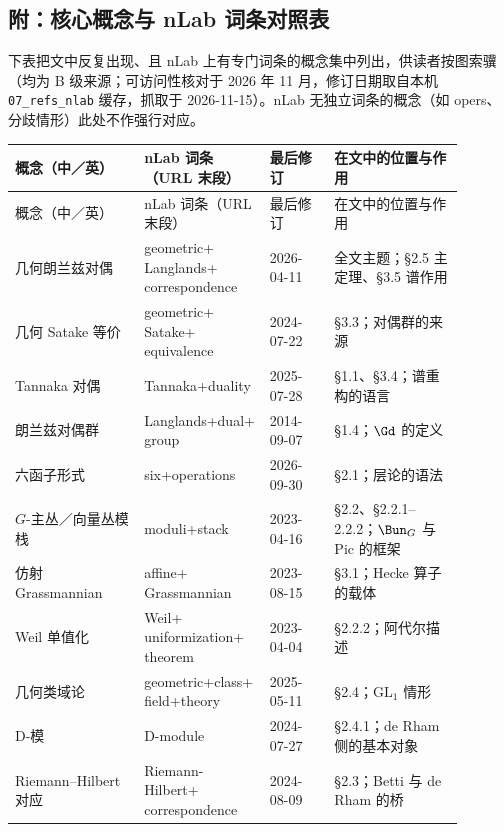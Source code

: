 \subsection*{附：核心概念与 nLab 词条对照表}

下表把文中反复出现、且 nLab 上有专门词条的概念集中列出，供读者按图索骥（均为 B 级来源；可访问性核对于 2026 年 11 月，修订日期取自本机 \texttt{07\_refs\_nlab} 缓存，抓取于 2026-11-15）。nLab 无独立词条的概念（如 opers、分歧情形）此处不作强行对应。

{\small
\begin{longtable}{@{}>{\raggedright\arraybackslash}p{0.26\linewidth}>{\raggedright\arraybackslash}p{0.24\linewidth}>{\raggedright\arraybackslash}p{0.13\linewidth}>{\raggedright\arraybackslash}p{0.26\linewidth}@{}}
\toprule
概念（中／英） & nLab 词条（URL 末段） & 最后修订 & 在文中的位置与作用 \\
\midrule
\endfirsthead
\toprule
概念（中／英） & nLab 词条（URL 末段） & 最后修订 & 在文中的位置与作用 \\
\midrule
\endhead
\bottomrule
\endfoot
几何朗兰兹对偶 & geometric+​\allowbreak Langlands+​\allowbreak correspondence & \mbox{2026-04-11} & 全文主题；§2.5 主定理、§3.5 谱作用 \\
几何 Satake 等价 & geometric+​\allowbreak Satake+​\allowbreak equivalence & \mbox{2024-07-22} & §3.3；对偶群的来源 \\
Tannaka 对偶 & Tannaka+​\allowbreak duality & \mbox{2025-07-28} & §1.1、§3.4；谱重构的语言 \\
朗兰兹对偶群 & Langlands+​\allowbreak dual+​\allowbreak group & \mbox{2014-09-07} & §1.4；$\Gd$ 的定义 \\
六函子形式 & six+​\allowbreak operations & \mbox{2026-09-30} & §2.1；层论的语法 \\
$G$-主丛／向量丛模栈 & moduli+​\allowbreak stack & \mbox{2023-04-16} & §2.2、§2.2.1--2.2.2；$\Bun_{G}$ 与 $\mathrm{Pic}$ 的框架 \\
仿射 Grassmannian & affine+​\allowbreak Grassmannian & \mbox{2023-08-15} & §3.1；Hecke 算子的载体 \\
Weil 单值化 & Weil+​\allowbreak uniformization+​\allowbreak theorem & \mbox{2023-04-04} & §2.2.2；阿代尔描述 \\
几何类域论 & geometric+​\allowbreak class+​\allowbreak field+​\allowbreak theory & \mbox{2025-05-11} & §2.4；$\mathrm{GL}_{1}$ 情形 \\
D-模 & D-module & \mbox{2024-07-27} & §2.4.1；de Rham 侧的基本对象 \\
Riemann--Hilbert 对应 & Riemann-Hilbert+​\allowbreak correspondence & \mbox{2024-08-09} & §2.3；Betti 与 de Rham 的桥 \\

\end{longtable}}
